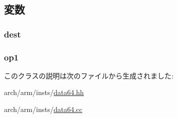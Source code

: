 \subsection{変数}
\hypertarget{classArmISA_1_1DataX1RegOp_aec72e8e45bdc87abeeeb75d2a8a9a716}{
\subsubsection[{dest}]{ {\bf dest}}}
\label{classArmISA_1_1DataX1RegOp_aec72e8e45bdc87abeeeb75d2a8a9a716}
\hypertarget{classArmISA_1_1DataX1RegOp_a4c465c43ad568f8bcf8ae71480e9cfea}{
\subsubsection[{op1}]{ {\bf op1}}}
\label{classArmISA_1_1DataX1RegOp_a4c465c43ad568f8bcf8ae71480e9cfea}


このクラスの説明は次のファイルから生成されました:\begin{DoxyCompactItemize}
\item 
arch/arm/insts/\hyperlink{data64_8hh}{data64.hh}\item 
arch/arm/insts/\hyperlink{data64_8cc}{data64.cc}\end{DoxyCompactItemize}
